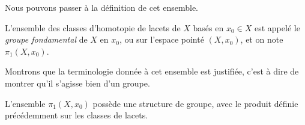Nous pouvons passer à la définition de cet ensemble.

\begin{definition}
L'ensemble des classes d'homotopie de lacets de $X$ basés en $x_0\in X$ est appelé le \emph{groupe fondamental} de $X$ en $x_0$, ou sur l'espace pointé $(X,x_0)$, et on note $\pi_1(X,x_0)$.
\end{definition}

Montrons que la terminologie donnée à cet ensemble est justifiée, c'est à dire de montrer qu'il s'agisse bien d'un groupe. 

\begin{theorem}
L'ensemble $\pi_1(X,x_0)$ possède une structure de groupe, avec le produit définie précédemment sur les classes de lacets.
\end{theorem}

